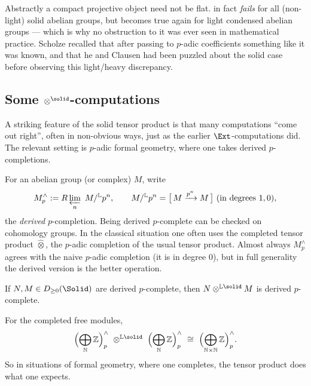 \begin{remark}
\label{rmk:6:flat-light}
Abstractly a compact projective object need not be flat.
 in fact \emph{fails} for all (non-light) solid abelian groups,
but becomes true again for light condensed abelian groups --- which is why no
obstruction to it was ever seen in mathematical practice. Scholze recalled that
after passing to $p$-adic coefficients something like it was known, and that he
and Clausen had been puzzled about the solid case before observing this
light/heavy discrepancy.
\end{remark}

\subsection{Some \texorpdfstring{$\otimes^{\solid}$-}{solid tensor product }computations}

A striking feature of the solid tensor product is that many computations ``come
out right'', often in non-obvious ways, just as the earlier $\Ext$-computations
did. The relevant setting is $p$-adic formal geometry, where one takes derived
$p$-completions.

\begin{notation}
\label{not:6:derived-p-completion}
For an abelian group (or complex) $M$, write
\begin{equation*}
M^{\wedge}_{p}:=R\varprojlim_{n}\ M/^{\mathbb{L}}p^{n},
\qquad
M/^{\mathbb{L}}p^{n}=\bigl[\,M\xrightarrow{p^{n}}M\,\bigr]\ (\text{in degrees }1,0),
\end{equation*}
the \emph{derived} $p$-completion. Being derived $p$-complete can be checked on
cohomology groups. In the classical situation one often uses the completed tensor
product $\widehat{\otimes}$, the $p$-adic completion of the usual tensor product.
Almost always $M^{\wedge}_{p}$ agrees with the naive $p$-adic completion (it is in
degree $0$), but in full generality the derived version is the better operation.
\end{notation}

\begin{proposition}
\label{prop:6:tensor-p-complete}
If $N,M\in D_{\geq0}(\Solid)$ are derived $p$-complete, then
$N\otimes^{\mathbb{L}\solid}M$ is derived $p$-complete.
\end{proposition}

\begin{corollary}
\label{cor:6:completed-sum-tensor}
For the completed free modules,
\begin{equation*}
\Bigl(\bigoplus_{\mathbb{N}}\mathbb{Z}\Bigr)^{\wedge}_{p}
\ \otimes^{\mathbb{L}\solid}\
\Bigl(\bigoplus_{\mathbb{N}}\mathbb{Z}\Bigr)^{\wedge}_{p}
\ \cong\
\Bigl(\bigoplus_{\mathbb{N}\times\mathbb{N}}\mathbb{Z}\Bigr)^{\wedge}_{p} .
\end{equation*}
So in situations of formal geometry, where one completes, the tensor product does
what one expects.
\end{corollary}

